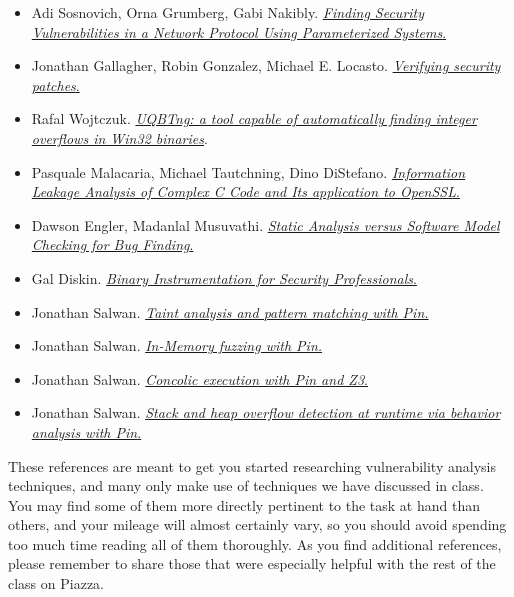 \documentclass[11pt]{article}
\begin{document}
\begin{itemize}
\item Adi Sosnovich, Orna Grumberg, Gabi Nakibly. \href{https://link.springer.com/chapter/10.1007/978-3-642-39799-8_51}{\emph{Finding Security Vulnerabilities in a Network Protocol Using Parameterized Systems}.}

\item Jonathan Gallagher, Robin Gonzalez, Michael E. Locasto. \href{https://dl.acm.org/citation.cfm?id=2687151}{\emph{Verifying security patches}.}

\item Rafal Wojtczuk. \href{https://events.ccc.de/congress/2005/fahrplan/attachments/552-Paper_AToolCapableOfAutomaticallyFindingIntegerOverflowsInWin32Binaries.pdf}{\emph{UQBTng: a tool capable of automatically finding integer overflows in Win32 binaries}}.

\item Pasquale Malacaria, Michael Tautchning, Dino DiStefano. \href{https://link.springer.com/chapter/10.1007/978-3-319-47166-2_63}{\emph{Information Leakage Analysis of Complex C Code and Its application to OpenSSL}.}

\item Dawson Engler, Madanlal Musuvathi. \href{https://link.springer.com/chapter/10.1007/978-3-540-24622-0_17}{\emph{Static Analysis versus Software Model Checking for Bug Finding}.}

\item Gal Diskin. \href{https://media.blackhat.com/bh-us-11/Diskin/BH_US_11_Diskin_Binary_Instrumentation_Slides.pdf}{\emph{Binary Instrumentation for Security Professionals}.}

\item Jonathan Salwan. \href{http://shell-storm.org/blog/Taint-analysis-and-pattern-matching-with-Pin/}{\emph{Taint analysis and pattern matching with Pin.}}

\item Jonathan Salwan. \href{http://shell-storm.org/blog/In-Memory-fuzzing-with-Pin/}{\emph{In-Memory fuzzing with Pin.}}

\item Jonathan Salwan. \href{http://shell-storm.org/blog/Binary-analysis-Concolic-execution-with-Pin-and-z3/}{\emph{Concolic execution with Pin and Z3}.}

\item Jonathan Salwan. \href{http://shell-storm.org/blog/Stack-and-heap-overflow-detection-at-runtime-via-behavior-analysis-and-PIN/}{\emph{Stack and heap overflow detection at runtime via behavior analysis with Pin}.}
\end{itemize}
These references are meant to get you started researching vulnerability analysis techniques, and many only make use of techniques we have discussed in class. You may find some of them more directly pertinent to the task at hand than others, and your mileage will almost certainly vary, so you should avoid spending too much time reading all of them thoroughly. As you find additional references, please remember to share those that were especially helpful with the rest of the class on Piazza.
\end{document}
